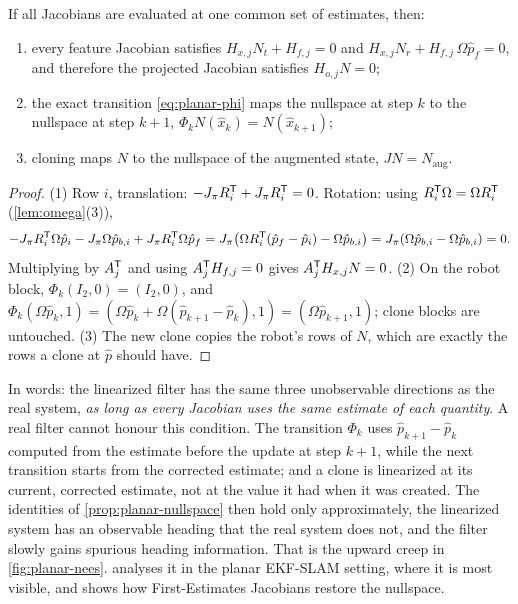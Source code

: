 \begin{proposition}
\label{prop:planar-nullspace}
If all Jacobians are evaluated at one common set of estimates, then:
\begin{enumerate}
  \item every feature Jacobian satisfies $H_{x,j}N_t + H_{f,j} = 0$ and $H_{x,j}N_r + H_{f,j}\,\Omega\hat p_f = 0$, and therefore the projected Jacobian
        satisfies $H_{o,j}N = 0$;
  \item the exact transition \eqref{eq:planar-phi} maps the nullspace at step $k$ to the nullspace at step $k+1$, $\Phi_kN(\hat x_k) = N(\hat x_{k+1})$;
  \item cloning maps $N$ to the nullspace of the augmented state, $JN = N_{\text{aug}}$.
\end{enumerate}
\end{proposition}
\begin{proof}
(1) Row $i$, translation: $-J_\pi R_i^{\mathsf{T}} + J_\pi R_i^{\mathsf{T}} = 0$. Rotation: using $R_i^{\mathsf{T}}\Omega = \Omega R_i^{\mathsf{T}}$ (\cref{lem:omega}(3)),
\begin{equation*}
  -J_\pi R_i^{\mathsf{T}}\Omega\hat p_i - J_\pi\Omega\hat p_{b,i} + J_\pi R_i^{\mathsf{T}}\Omega\hat p_f = J_\pi\big(\Omega R_i^{\mathsf{T}}(\hat p_f - \hat p_i) - \Omega\hat p_{b,i}\big) = J_\pi(\Omega\hat p_{b,i} - \Omega\hat p_{b,i}) = 0 .
\end{equation*}
Multiplying by $A_j^{\mathsf{T}}$ and using $A_j^{\mathsf{T}} H_{f,j} = 0$ gives $A_j^{\mathsf{T}} H_{x,j}N = 0$.
(2) On the robot block, $\Phi_k(I_2, 0) = (I_2, 0)$, and $\Phi_k(\Omega\hat p_k, 1) = (\Omega\hat p_k + \Omega(\hat p_{k+1} - \hat p_k), 1) = (\Omega\hat p_{k+1}, 1)$; clone blocks are untouched.
(3) The new clone copies the robot's rows of $N$, which are exactly the rows a clone at $\hat p$ should have.
\end{proof}

In words: the linearized filter has the same three unobservable directions as the real system, \emph{as long as every Jacobian uses the same
estimate of each quantity}. A real filter cannot honour this condition. The transition $\Phi_k$ uses $\hat p_{k+1} - \hat p_k$ computed from the
estimate before the update at step $k+1$, while the next transition starts from the corrected estimate; and a clone is linearized at its
current, corrected estimate, not at the value it had when it was created. The identities of \cref{prop:planar-nullspace} then hold only
approximately, the linearized system has an observable heading that the real system does not, and the filter slowly gains spurious heading
information. That is the upward creep in \cref{fig:planar-nees}.  analyses it in the planar EKF-SLAM setting, where it is most
visible, and shows how First-Estimates Jacobians restore the nullspace.

